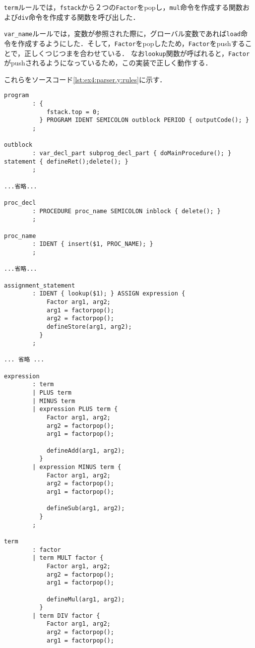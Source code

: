 \documentclass[uplatex]{jsarticle}
\begin{document}
\verb#term#ルールでは，\verb#fstack#から２つの\verb#Factor#をpopし，\verb#mul#命令を作成する関数および\verb#div#命令を作成する関数を呼び出した．

\verb#var_name#ルールでは，変数が参照された際に，グローバル変数であれば\verb#load#命令を作成するようにした．そして，\verb#Factor#をpopしたため，\verb#Factor#をpushすることで，正しくつじつまを合わせている．
なお\verb#lookup#関数が呼ばれると，\verb#Factor#がpushされるようになっているため，この実装で正しく動作する．

これらをソースコード\ref{lst:ex4:parser.y:rules}に示す．

\begin{lstlisting}[caption=構文規則部の処理,label=lst:ex4:parser.y:rules]
program
        : {
            fstack.top = 0;
          } PROGRAM IDENT SEMICOLON outblock PERIOD { outputCode(); }
        ;

outblock
        : var_decl_part subprog_decl_part { doMainProcedure(); } statement { defineRet();delete(); }
        ;

...省略...

proc_decl
        : PROCEDURE proc_name SEMICOLON inblock { delete(); }
        ;

proc_name
        : IDENT { insert($1, PROC_NAME); }
        ;

...省略...

assignment_statement
        : IDENT { lookup($1); } ASSIGN expression {
            Factor arg1, arg2;
            arg1 = factorpop();
            arg2 = factorpop();
            defineStore(arg1, arg2);
          }
        ;

... 省略 ...

expression
        : term
        | PLUS term
        | MINUS term
        | expression PLUS term {
            Factor arg1, arg2;
            arg2 = factorpop();
            arg1 = factorpop();

            defineAdd(arg1, arg2);
          }
        | expression MINUS term {
            Factor arg1, arg2;
            arg2 = factorpop();
            arg1 = factorpop();

            defineSub(arg1, arg2);
          }
        ;

term
        : factor
        | term MULT factor {
            Factor arg1, arg2;
            arg2 = factorpop();
            arg1 = factorpop();

            defineMul(arg1, arg2);
          }
        | term DIV factor {
            Factor arg1, arg2;
            arg2 = factorpop();
            arg1 = factorpop();


\end{lstlisting}
\end{document}
